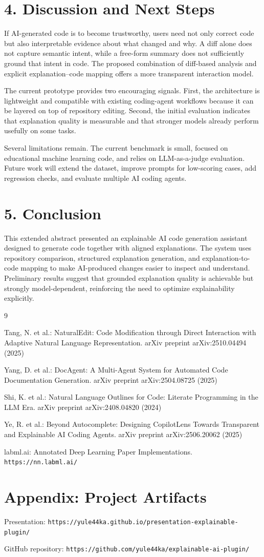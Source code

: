 \documentclass[11pt]{article}
\begin{document}
\section*{4. Discussion and Next Steps}
If AI-generated code is to become trustworthy, users need not only correct code but also interpretable evidence about what changed and why. A diff alone does not capture semantic intent, while a free-form summary does not sufficiently ground that intent in code. The proposed combination of diff-based analysis and explicit explanation--code mapping offers a more transparent interaction model.

The current prototype provides two encouraging signals. First, the architecture is lightweight and compatible with existing coding-agent workflows because it can be layered on top of repository editing. Second, the initial evaluation indicates that explanation quality is measurable and that stronger models already perform usefully on some tasks.

Several limitations remain. The current benchmark is small, focused on educational machine learning code, and relies on LLM-as-a-judge evaluation. Future work will extend the dataset, improve prompts for low-scoring cases, add regression checks, and evaluate multiple AI coding agents.

\section*{5. Conclusion}
This extended abstract presented an explainable AI code generation assistant designed to generate code together with aligned explanations. The system uses repository comparison, structured explanation generation, and explanation-to-code mapping to make AI-produced changes easier to inspect and understand. Preliminary results suggest that grounded explanation quality is achievable but strongly model-dependent, reinforcing the need to optimize explainability explicitly.

\begin{thebibliography}{9}

Tang, N. et al.:
NaturalEdit: Code Modification through Direct Interaction with Adaptive Natural Language Representation.
arXiv preprint arXiv:2510.04494 (2025)

Yang, D. et al.:
DocAgent: A Multi-Agent System for Automated Code Documentation Generation.
arXiv preprint arXiv:2504.08725 (2025)

Shi, K. et al.:
Natural Language Outlines for Code: Literate Programming in the LLM Era.
arXiv preprint arXiv:2408.04820 (2024)

Ye, R. et al.:
Beyond Autocomplete: Designing CopilotLens Towards Transparent and Explainable AI Coding Agents.
arXiv preprint arXiv:2506.20062 (2025)

labml.ai:
Annotated Deep Learning Paper Implementations.
\texttt{https://nn.labml.ai/}

\end{thebibliography}

\appendix
\section*{Appendix: Project Artifacts}
Presentation: \texttt{https://yule44ka.github.io/presentation-explainable-plugin/}

GitHub repository: \texttt{https://github.com/yule44ka/explainable-ai-plugin/}
\end{document}
